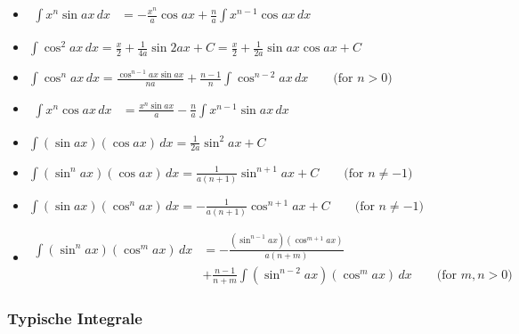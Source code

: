 \documentclass[25pt]{sciposter}
\begin{document}
\begin{multicols}{3}
\begin{itemize}
	\item ${\displaystyle {\begin{aligned}\int x^{n}\sin ax\,dx&=-{\frac {x^{n}}{a}}\cos ax+{\frac {n}{a}}\int x^{n-1}\cos ax\,dx\end{aligned}}}$
	
	\item ${\displaystyle \int \cos ^{2}{ax}\,dx={\frac {x}{2}}+{\frac {1}{4a}}\sin 2ax+C={\frac {x}{2}}+{\frac {1}{2a}}\sin ax\cos ax+C}$
	
	\item ${\displaystyle \int \cos ^{n}ax\,dx={\frac {\cos ^{n-1}ax\sin ax}{na}}+{\frac {n-1}{n}}\int \cos ^{n-2}ax\,dx\qquad {\mbox{(for }}n>0{\mbox{)}}}$
	
	\item ${\displaystyle {\begin{aligned}\int x^{n}\cos ax\,dx&={\frac {x^{n}\sin ax}{a}}-{\frac {n}{a}}\int x^{n-1}\sin ax\,dx\end{aligned}}}$
	
	
	
	
	
	\item ${\displaystyle \int (\sin ax)(\cos ax)\,dx={\frac {1}{2a}}\sin ^{2}ax+C}$
	
	\item ${\displaystyle \int (\sin ^{n}ax)(\cos ax)\,dx={\frac {1}{a(n+1)}}\sin ^{n+1}ax+C\qquad {\mbox{(for }}n\neq -1{\mbox{)}}}$
	
	\item ${\displaystyle \int (\sin ax)(\cos ^{n}ax)\,dx=-{\frac {1}{a(n+1)}}\cos ^{n+1}ax+C\qquad {\mbox{(for }}n\neq -1{\mbox{)}}}$
	
	\item $ {\displaystyle {\begin{aligned}\int (\sin ^{n}ax)(\cos ^{m}ax)\,dx&=-{\frac {(\sin ^{n-1}ax)(\cos ^{m+1}ax)}{a(n+m)}}\\&+{\frac {n-1}{n+m}}\int (\sin ^{n-2}ax)(\cos ^{m}ax)\,dx\qquad {\mbox{(for }}m,n>0{\mbox{)}}\end{aligned}}} $
	
	
\end{itemize}



\subsubsection*{Typische Integrale}


\end{multicols}
\end{document}

